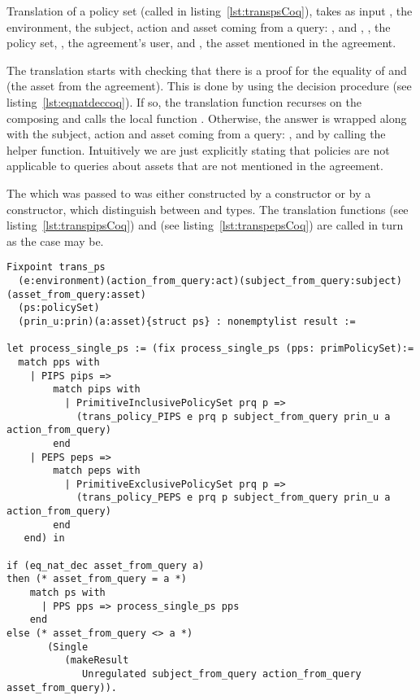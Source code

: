Translation of a policy set (called  in listing~\ref{lst:transpsCoq}), takes as input , the environment, the subject, action and asset coming from a query: ,  and , , the policy set, , the agreement's user, and , the asset mentioned in the agreement. 

The translation starts with checking that there is a proof for the equality of  and  (the asset from the agreement). This is done by using the decision procedure  (see listing~\ref{lst:eqnatdeccoq}). If so, the translation function recurses on the composing  and calls the local function . Otherwise, the  answer is wrapped along with the subject, action and asset coming from a query: ,  and  by calling the  helper function. Intuitively we are just explicitly stating that policies are not applicable to queries about assets that are not mentioned in the agreement. 

The  which was passed to  was either constructed by a  constructor or by a  constructor, which distinguish between  and  types. The translation functions  (see listing~\ref{lst:transpipsCoq}) and  (see listing~\ref{lst:transpepsCoq}) are called in turn as the case may be.


\begin{minipage}[c]{0.95\textwidth}
\begin{lstlisting}
Fixpoint trans_ps
  (e:environment)(action_from_query:act)(subject_from_query:subject)(asset_from_query:asset)
  (ps:policySet)
  (prin_u:prin)(a:asset){struct ps} : nonemptylist result :=

let process_single_ps := (fix process_single_ps (pps: primPolicySet):= 
  match pps with 
    | PIPS pips => 
        match pips with 
          | PrimitiveInclusivePolicySet prq p => 
            (trans_policy_PIPS e prq p subject_from_query prin_u a action_from_query)                
        end
    | PEPS peps => 
        match peps with 
          | PrimitiveExclusivePolicySet prq p => 
            (trans_policy_PEPS e prq p subject_from_query prin_u a action_from_query)
        end  
   end) in

if (eq_nat_dec asset_from_query a)
then (* asset_from_query = a *)  
    match ps with
      | PPS pps => process_single_ps pps
    end
else (* asset_from_query <> a *)
       (Single 
          (makeResult 
             Unregulated subject_from_query action_from_query asset_from_query)).
\end{lstlisting}
\end{minipage}


